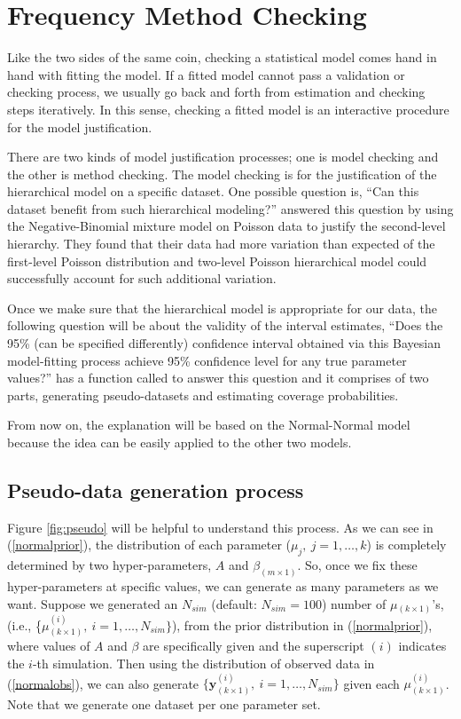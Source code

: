 \documentclass[article]{jss}
\begin{document}
\section[Frequency method checking]{Frequency Method Checking}
Like the two sides of the same coin, checking a statistical model comes hand in hand with fitting the model. If a fitted model cannot pass a validation or checking process, we usually go back and forth from estimation and checking steps iteratively. In this sense, checking a fitted model is an interactive procedure for the model justification.


There are two kinds of model justification processes; one is model checking and the other is method checking. The model checking is for the justification of the hierarchical model on a specific dataset. One possible question is, ``Can this dataset benefit from such hierarchical modeling?'' \cite{modelchecking1996} answered this question by using the Negative-Binomial mixture model on Poisson data to justify the second-level hierarchy. They found that their data had more variation than expected of the first-level Poisson distribution and two-level Poisson hierarchical model could successfully account for such additional variation.


Once we make sure that the hierarchical model is appropriate for our data, the following question will be about the validity of the interval estimates, ``Does the 95\% (can be specified differently) confidence interval obtained via this Bayesian model-fitting process achieve 95\% confidence level  for any true parameter values?''  has a function called  to answer this question and it comprises of two parts, generating pseudo-datasets and estimating coverage probabilities.

From now on, the explanation will be based on the Normal-Normal model because the idea can be easily applied to the other two models.

\subsection{Pseudo-data generation process}
Figure \ref{fig:pseudo} will be helpful to understand this process. As we can see in (\ref{normalprior}), the distribution of each parameter ($\mu_{j},~j=1,\ldots, k$) is completely determined by two hyper-parameters, $A$ and $\beta_{(m\times1)}$. So, once we fix these hyper-parameters at specific values, we can generate as many parameters as we want. Suppose we generated an $N_{sim}$ (default: $N_{sim} = 100$) number of {\boldmath $\mu$}$_{(k\times1)}$'s, (i.e., \{{\boldmath $\mu$}$^{(i)}_{(k\times1)},~i=1, \ldots, N_{sim}\}$), from the prior distribution in (\ref{normalprior}), where values of $A$ and $\beta$ are specifically given and the superscript $(i)$ indicates the $i$-th simulation. Then using the distribution of observed data in (\ref{normalobs}), we can also generate $\{\mathbf{y}^{(i)}_{(k\times1)},~i=1, \ldots, N_{sim}\}$ given each {\boldmath$\mu$}$^{(i)}_{(k\times1)}$. Note that we generate one dataset per one parameter set.
\end{document}
